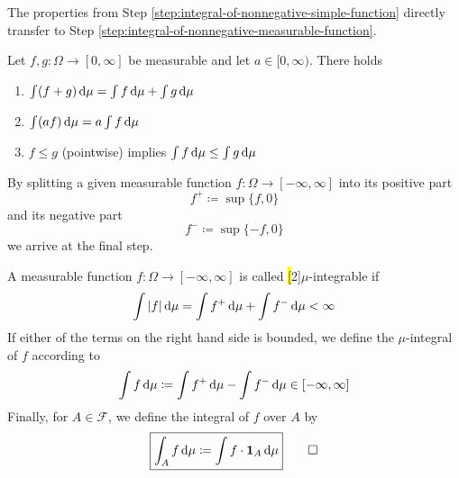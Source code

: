The properties from Step \ref{step:integral-of-nonnegative-simple-function} directly transfer to Step \ref{step:integral-of-nonnegative-measurable-function}.

\begin{lemma}\label{lem:elementary-properties-integral-nonnegative-measurable-functions}
Let $f,g : \Omega \to [0,\infty]$ be measurable and let $a \in [0,\infty)$.
There holds
\begin{enumerate}[label=(\roman*)]
\item \label{lem:elementary-properties-integral-nonnegative-measurable-functions:additivity}
$\int (f+g)\,\mathrm{d}\mu = \int f\,\mathrm{d}\mu + \int g\,\mathrm{d}\mu$
\item \label{lem:elementary-properties-integral-nonnegative-measurable-functions:homogeneity}
$\int (af)\,\mathrm{d}\mu = a\int f\,\mathrm{d}\mu$
\item \label{lem:elementary-properties-integral-nonnegative-measurable-functions:monotonicity}
$f \leq g$ (pointwise) implies $\int f\,\mathrm{d}\mu \leq \int g\,\mathrm{d}\mu$
\qedhere
\end{enumerate}
\end{lemma}

By splitting a given measurable function $f : \Omega \to [-\infty,\infty]$ into its positive part
\[
f^+ \coloneq \sup\{f,0\}
\]
and its negative part
\[
f^- \coloneq \sup\{-f,0\}
\]
we arrive at the final step.

\begin{definition}\label{def:integral-of-integrable-function}
A measurable function $f : \Omega \to [-\infty,\infty]$ is called \hl[2]{$\mu$-integrable} if
\[
\int |f|\,\mathrm{d}\mu
=
\int f^+\,\mathrm{d}\mu
+
\int f^-\,\mathrm{d}\mu
<
\infty
\]
If either of the terms on the right hand side is bounded, we define the $\mu$-integral of $f$ according to
\begin{equation}\label{eq:integral-of-integrable-function}
\int f\,\mathrm{d}\mu
\coloneq
\int f^+\,\mathrm{d}\mu
-
\int f^-\,\mathrm{d}\mu
\in [-\infty,\infty]
\end{equation}
Finally, for $A \in \mathcal{F}$, we define the integral of $f$ over $A$ by
\begin{equation}\label{eq:integral-over-set}
\boxed{
\int_A f\,\mathrm{d}\mu
\coloneq
\int f \cdot \mathbf{1}_A\,\mathrm{d}\mu
}
\qedhere
\end{equation}
\end{definition}





